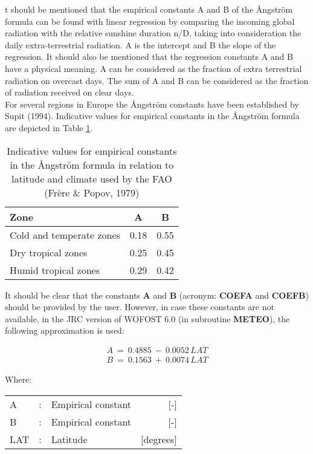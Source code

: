 t should be mentioned that the empirical constants A and B of the \AA ngstr\"{o}m formula can be found with linear regression by comparing the incoming global radiation with the
relative sunshine duration n/D, taking into consideration the daily extra-terrestrial
radiation. A is the intercept and B the slope of the regression. It should also be mentioned
that the regression constants A and B have a physical meaning. A can be considered as
the fraction of extra terrestrial radiation on overcast days. The sum of A and B can be
considered as the fraction of radiation received on clear days.\\
For several regions in Europe the \AA ngstr\"{o}m constants have been established by Supit
(1994). Indicative values for empirical constants in the \AA ngstr\"{o}m formula are depicted in Table \ref{tab:angstAB}.

\begin{table}
\caption{Indicative values for empirical constants in the \AA ngstr\"{o}m formula in
relation to latitude and climate used by the FAO (Fr\`{e}re \& Popov, 1979)}
\label{tab:angstAB}
\begin{tabular}{lcc}
\hline
Zone &   A &  B                \\
\hline
Cold and temperate zones   &  0.18 &  0.55\\
Dry tropical zones  &   0.25  & 0.45\\
Humid tropical zones  &   0.29 &  0.42\\
\hline
\end{tabular}
\end{table}

It should be clear that the constants {\bf A} and {\bf B} (acronym: {\bf COEFA} and {\bf COEFB}) should be
provided by the user. However, in case these constants are not available, in the JRC
version of WOFOST 6.0 (in subrou\-tine {\bf METEO}), the following approximation is used:

\begin{eqnarray*}
 A~=~0.4885~-~0.0052 \, LAT \\
 B~=~0.1563~+~0.0074 \, LAT 
\end{eqnarray*}

Where:\\
\begin{tabularx}{\textwidth}{llXr}
A &:& Empirical constant  & [-]\\
B &:& Empirical constant  & [-]\\
LAT &:& Latitude  & [degrees]\\
\end{tabularx}

